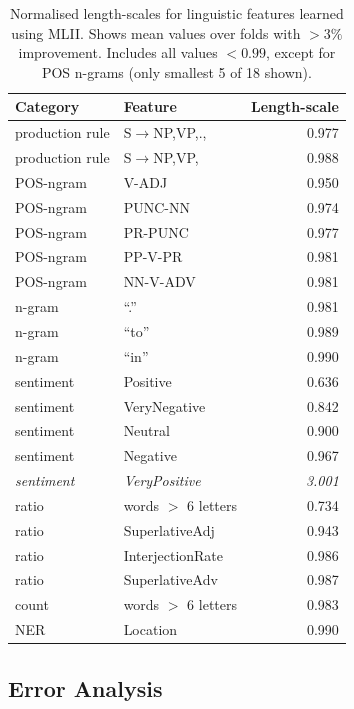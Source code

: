 \begin{table}[t]
\small
  \begin{tabularx}{\columnwidth}{l | X | r }
  Category & Feature & Length-scale\\
  \hline
  production rule & S$\to$NP,VP,.,	& 0.977\nonumber\\  
  production rule & S$\to$NP,VP,	& 0.988\nonumber\\  
  \hline
  POS-ngram & V-ADJ	& 0.950	\nonumber\\
  POS-ngram & PUNC-NN	& 0.974 \nonumber\\  
  POS-ngram & PR-PUNC	& 0.977	\nonumber\\
  POS-ngram & PP-V-PR	& 0.981\nonumber\\
  POS-ngram & NN-V-ADV	& 0.981\nonumber\\    
  \hline
  n-gram & ``.''	& 0.981\nonumber\\
  n-gram & ``to'' 	& 0.989\nonumber\\
  n-gram & ``in''	& 0.990\nonumber\\  
  \hline
  sentiment & Positive	& 0.636 \nonumber\\
  sentiment & VeryNegative	 & 0.842 \nonumber\\
  sentiment & Neutral	& 0.900 \nonumber\\
  sentiment & Negative & 0.967 \nonumber\\    
\emph{sentiment} & \emph{VeryPositive} & \emph{3.001} \nonumber \\%
\hline
  ratio & words $>$ 6 letters & 0.734 \nonumber\\
  ratio & SuperlativeAdj	& 0.943 \nonumber\\
  ratio & InterjectionRate	& 0.986 \nonumber\\
  ratio &	SuperlativeAdv	& 0.987 \nonumber\\
 \hline
  count & words $>$ 6 letters	& 0.983 \nonumber\\  
 \hline
  NER & Location & 0.990 \nonumber  
  \end{tabularx}
  \caption{Normalised length-scales for linguistic features learned using MLII. Shows mean values over folds with $>3\%$ improvement. Includes all values $<0.99$, except for POS n-grams (only smallest 5 of 18 shown).  }
  \label{tab:extreme_features}
\end{table}

\subsection{Error Analysis}

